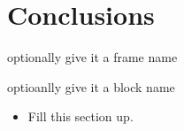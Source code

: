 \section{Conclusions}
\begin{frame}{optionally give it a frame name}
\begin{block}{optioanlly give it a block name}
\begin{itemize}
\item Fill this section up.
\end{itemize}
\end{block}
\end{frame}

